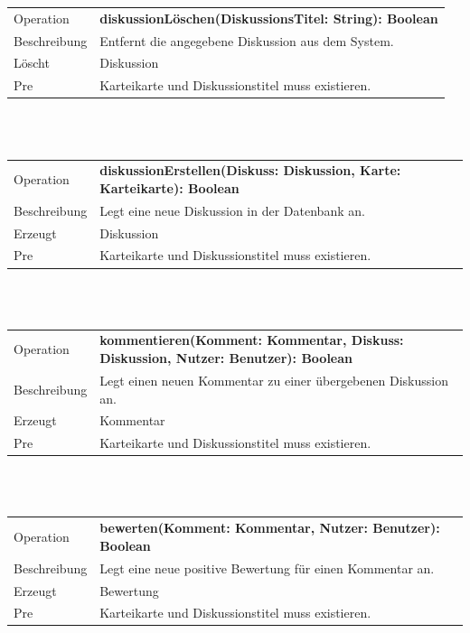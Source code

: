 \documentclass[12pt,a4paper]{article}
\begin{document}
{\begin{tabular}{|l|p{12cm}|}
	\hline
	Operation &  \textbf{diskussionLöschen(DiskussionsTitel: String): Boolean} \\ 
	Beschreibung & Entfernt die angegebene Diskussion aus dem System.\\ 
	Löscht & Diskussion \\ 
	Pre & Karteikarte und Diskussionstitel muss existieren. \\ 
	\hline 
\end{tabular} \\\\

\begin{tabular}{|l|p{12cm}|}
	\hline
	Operation &  \textbf{diskussionErstellen(Diskuss: Diskussion, Karte: Karteikarte): Boolean} \\ 
	Beschreibung & Legt eine neue Diskussion in der Datenbank an.\\ 
	Erzeugt & Diskussion \\ 
	Pre & Karteikarte und Diskussionstitel muss existieren. \\ 
	\hline 
\end{tabular} \\\\

\begin{tabular}{|l|p{12cm}|}
	\hline
	Operation &  \textbf{kommentieren(Komment: Kommentar, Diskuss: Diskussion, Nutzer: Benutzer): Boolean} \\ 
	Beschreibung & Legt einen neuen Kommentar zu einer übergebenen Diskussion an.\\ 
	Erzeugt & Kommentar \\ 
	Pre & Karteikarte und Diskussionstitel muss existieren. \\ 
	\hline 
\end{tabular} \\\\

\begin{tabular}{|l|p{12cm}|}
	\hline
	Operation &  \textbf{bewerten(Komment: Kommentar, Nutzer: Benutzer): Boolean }\\ 
	Beschreibung & Legt eine neue positive Bewertung für einen Kommentar an.\\ 
	Erzeugt & Bewertung \\ 
	Pre & Karteikarte und Diskussionstitel muss existieren. \\ 
	\hline 
\end{tabular} \\\\

}
\end{document}
